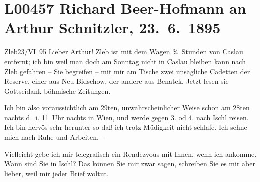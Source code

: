 

\section[Richard Beer-Hofmann an Arthur Schnitzler, 23. 6. 1895]{L00457 Richard Beer-Hofmann an Arthur Schnitzler, 23. 6. 1895}
\nopagebreak{}
\rehead{ }\normalsize\beginnumbering{}
\toendnotes[C]{\smallbreak\pagebreak[2]}
\pstart
           {\pb}\uline{Zleb}23/VI 95\pend
           \vspace{0.5em}
\pstart
           Lieber Arthur!{ }Zleb ist mit dem Wagen ¾ Stunden von Caslau entfernt; ich bin weil man doch am
                  Sonntag nicht in Caslau bleiben
               kann nach Zleb gefahren – Sie begreifen – mit mir
               am Tische zwei unsägliche Cadetten der Reserve, einer aus Neu-Bidschow, der andere {\pb}aus Benatek. Jetzt lesen sie Gottseidank böhmische Zeitungen.\pend
           
\pstart
           Ich bin also voraussichtlich am 29ten, unwahrscheinlicher Weise schon am
                  28ten{ }nachts d. i. 11 Uhr nachts in Wien, und werde gegen 3. od 4. nach Ischl reisen. Ich bin nervös sehr herunter {\pb}so daß ich trotz Müdigkeit nicht
               schlafe. Ich sehne mich nach Ruhe und Arbeiten. –\pend
           
\pstart
           Vielleicht gebe ich mir telegrafisch ein Rendezvous mit Ihnen, wenn ich ankomme. Wann
               sind Sie in Ischl? Das können Sie mir zwar sagen,
               schreiben Sie es mir {\pb}aber lieber,
               weil mir jeder Brief woltut.\pend
           
